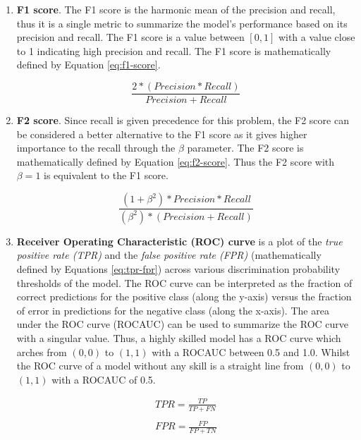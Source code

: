 \begin{enumerate}
\item \textbf{F1 score}. The F1 score is the harmonic mean of the
  precision and recall, thus it is a single metric to summarize the
  model's performance based on its precision and recall. The F1 score
  is a value between $[0, 1]$ with a value close to 1 indicating high
  precision and recall. The F1 score is mathematically defined by
  Equation \ref{eq:f1-score}.

  \begin{equation}
    \frac{2 * (Precision * Recall)}{Precision + Recall}
    \label{eq:f1-score}
  \end{equation}
  
\item \textbf{F2 score}. Since recall is given precedence for this
  problem, the F2 score can be considered a better alternative to the
  F1 score as it gives higher importance to the recall through the
  $\beta$ parameter. The F2 score is mathematically defined by
  Equation \ref{eq:f2-score}. Thus the F2 score with $\beta = 1$ is
  equivalent to the F1 score.

  \begin{equation}
    \frac{(1 + \beta^{2}) * Precision * Recall}{(\beta^{2}) *
      (Precision + Recall)}
    \label{eq:f2-score}
  \end{equation}
  
\item \textbf{Receiver Operating Characteristic (ROC) curve} is a plot
  of the \emph{true positive rate (TPR)} and the \emph{false positive
  rate (FPR)} (mathematically defined by Equations \ref{eq:tpr-fpr})
  across various discrimination probability thresholds of the model.
  The ROC curve can be interpreted as the fraction of correct
  predictions for the positive class (along the y-axis) versus the
  fraction of error in predictions for the negative class (along the
  x-axis). The area under the ROC curve (ROCAUC) can be used to
  summarize the ROC curve with a singular value. Thus, a highly
  skilled model has a ROC curve which arches from $(0,0)$ to $(1,1)$
  with a ROCAUC  between 0.5 and 1.0. Whilst the ROC curve of a model
  without any skill is a straight line from $(0,0)$ to $(1,1)$ with a
  ROCAUC of 0.5.

  \begin{equation}
    \begin{align*}
      TPR = \frac{TP}{TP + FN} \\\\
      FPR = \frac{FP}{FP + TN}
    \label{eq:tpr-fpr}
    \end{align*}
  \end{equation}
  

\end{enumerate}

